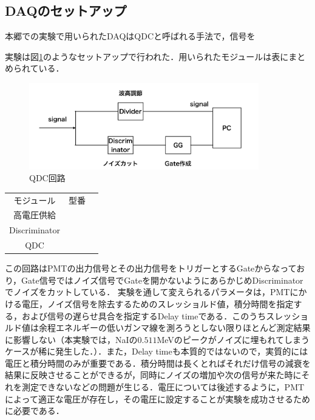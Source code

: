 \documentclass[a4j]{jarticle}
\begin{document}
\subsection{DAQのセットアップ}
本郷での実験で用いられたDAQはQDCと呼ばれる手法で，信号を

実験は図\ref{012905_3Sep18}のようなセットアップで行われた．用いられたモジュールは表にまとめられている．
\begin{figure}[htb]
 \centering
 \includegraphics[bb=0 0 1935 731,width=10cm]{QDC.jpg}
 \caption{QDC回路}
 \label{012905_3Sep18}
\end{figure}



\begin{table}[htb]
 \centering
 \begin{tabular}{|c|c|c|}
  モジュール&型番 & \\
  高電圧供給& & \\
  Discriminator& & \\
  QDC& & \\
 \end{tabular}
\end{table}

この回路はPMTの出力信号とその出力信号をトリガーとするGateからなっており，Gate信号ではノイズ信号でGateを開かないようにあらかじめDiscriminatorでノイズをカットしている．
 実験を通して変えられるパラメータは，PMTにかける電圧，ノイズ信号を除去するためのスレッショルド値，積分時間を指定する，および信号の遅らせ具合を指定するDelay timeである．このうちスレッショルド値は余程エネルギーの低いガンマ線を測ろうとしない限りほとんど測定結果に影響しない（本実験では，NaIの$0.511$MeVのピークがノイズに埋もれてしまうケースが稀に発生した．）．また，Delay timeも本質的ではないので，実質的には電圧と積分時間のみが重要である．積分時間は長くとればそれだけ信号の減衰を結果に反映させることができるが，同時にノイズの増加や次の信号が来た時にそれを測定できないなどの問題が生じる．電圧については後述するように，PMTによって適正な電圧が存在し，その電圧に設定することが実験を成功させるために必要である．
\end{document}
